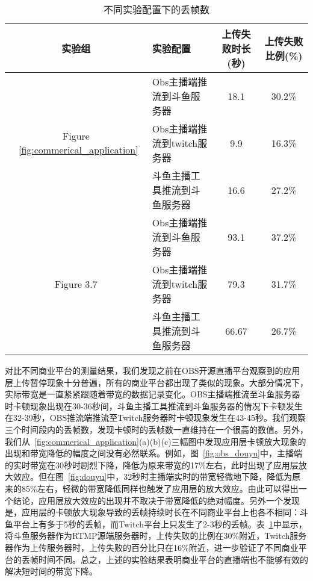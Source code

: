 \begin{table}[h]
    \centering
    \caption{不同实验配置下的丢帧数}
    \label{tb:drop}
    \begin{tabularx}{\linewidth}{clcc}
        \toprule[1.5pt]
        \textbf{实验组} & \textbf{实验配置} & \textbf{上传失败时长(秒)} & \textbf{上传失败比例(\%)}   \\ \midrule[1pt]
        \multirow{3}{*}{Figure ~\ref{fig:commerical_application}} & Obs主播端推流到斗鱼服务器               & 18.1         & 30.2\%                           \\ %
        & Obs主播端推流到twitch服务器              & 9.9        & 16.3\%    \\ %
        & 斗鱼主播工具推流到斗鱼服务器            & 16.6      & 27.2\% \\ \cline{2-4}
        \multirow{4}{*}{Figure 3.7} & Obs主播端推流到斗鱼服务器            & 93.1      & 37.2\%     \\ %
        & Obs主播端推流到twitch服务器             & 79.3      & 31.7\%  \\ %
        & 斗鱼主播工具推流到斗鱼服务器              & 66.67         & 26.7\%  \\
        \bottomrule[1.5pt]
    \end{tabularx}
\end{table}

对比不同商业平台的测量结果，我们发现之前在OBS开源直播平台观察到的应用层上传暂停现象十分普遍，所有的商业平台都出现了类似的现象。大部分情况下，实际带宽是一直紧紧跟随着带宽的数据记录变化。OBS主播端推流至斗鱼服务器时卡顿现象出现在30-36秒间，斗鱼主播工具推流到斗鱼服务器的情况下卡顿发生在32-39秒，OBS推流端推流至Twitch服务器时卡顿现象发生在43-45秒。我们观察三个时间段内的丢帧数，发现卡顿时的丢帧数一直维持在一个很高的数值。另外，我们从~\ref{fig:commerical_application}(a)(b)(c)三幅图中发现应用层卡顿放大现象的出现和带宽降低的幅度之间没有必然联系。例如，图~\ref{fig:obs_douyu}中，主播端的实时带宽在30秒时剧烈下降，降低为原来带宽的17\%左右，此时出现了应用层放大效应。但在图~\ref{fig:douyu}中，32秒时主播端实时的带宽轻微地下降，降低为原来的85\%左右，轻微的带宽降低同样也触发了应用层的放大效应。由此可以得出一个结论，应用层放大效应的出现并不取决于带宽降低的绝对幅度。另外一个发现是，应用层的卡顿放大现象导致的丢帧持续时长在不同商业平台上也各不相同：斗鱼平台上有多于5秒的丢帧，而Twitch平台上只发生了2-3秒的丢帧。表~\ref{tb:drop}中显示，将斗鱼服务器作为RTMP源端服务器时，上传失败的比例在30\%附近，Twitch服务器作为上传服务器时，上传失败的百分比只在16\%附近，进一步验证了不同商业平台的丢帧时间不同。总之，上述的实验结果表明商业平台的直播端也不能够有效的解决短时间的带宽下降。


